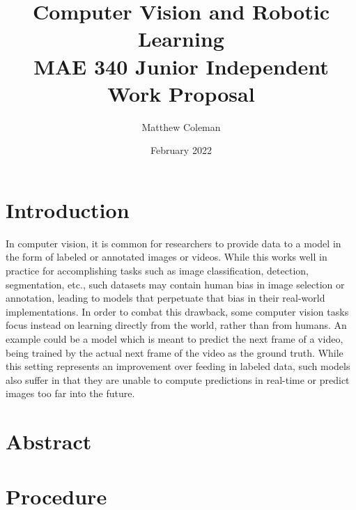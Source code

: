 \documentclass[10pt, letterpaper, twocolumn]{article}
\title{
	Computer Vision and Robotic Learning \\
	\large{MAE 340 Junior Independent Work Proposal}
}
\author{Matthew Coleman}
\date{February 2022}
\begin{document}
\maketitle

\section{Introduction}

In computer vision, it is common for researchers to provide data to a model in the form of labeled or annotated images or videos. While this works well in practice for accomplishing tasks such as image classification, detection, segmentation, etc., such datasets may contain human bias in image selection or annotation, leading to models that perpetuate that bias in their real-world implementations.\cite{olga_biases} In order to combat this drawback, some computer vision tasks focus instead on learning directly from the world, rather than from humans. An example could be a model which is meant to predict the next frame of a video, being trained by the actual next frame of the video as the ground truth. While this setting represents an improvement over feeding in labeled data, such models also suffer in that they are unable to compute predictions in real-time or predict images too far into the future.

\section{Abstract}

\section{Procedure}


\end{document}

